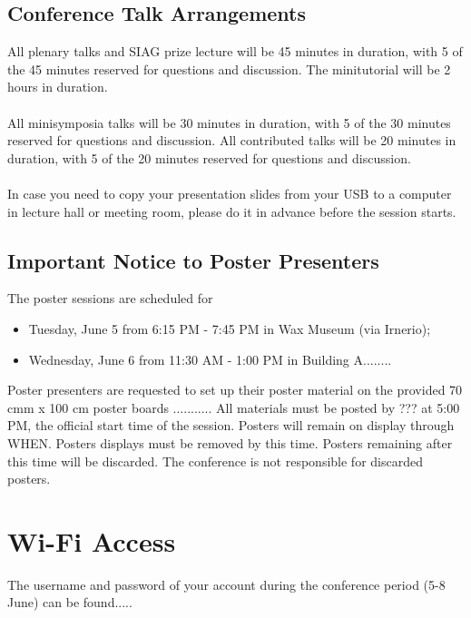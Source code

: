 \begin{multicols}{2}
\subsection*{Conference Talk Arrangements}
All plenary talks and SIAG prize lecture will be 45 minutes in duration,
with 5 of the 45 minutes reserved for questions and discussion.
The minitutorial will be 2 hours in duration.\\\\
All minisymposia talks will be 30 minutes in duration, with 5 of the 30
minutes reserved for questions and discussion.
All contributed talks will be 20 minutes in duration, with 5 of the 20
minutes reserved for questions and discussion.\\\\
In case you need to copy your presentation slides from your USB to a
computer in lecture hall or meeting room, please do it in advance before
the session starts.
\subsection*{Important Notice to Poster Presenters}
The poster sessions are scheduled for
\begin{itemize}
\item Tuesday, June 5 from 6:15 PM - 7:45 PM in Wax Museum (via Irnerio);
\item Wednesday, June 6 from 11:30 AM - 1:00 PM in Building A........
\end{itemize} Poster
presenters are requested to set up
their poster material on the provided
70 cmm x 100 cm poster boards ........... 
All materials must
be posted by ??? at
5:00 PM, the official start time of
the session. Posters will remain on display through WHEN.
Posters displays must be removed by this time. Posters remaining after this time will be discarded.
The conference is not responsible for
discarded posters.
\section*{Wi-Fi Access}
The username and password of your account during the conference period (5-8 June) can be found.....

\end{multicols}
